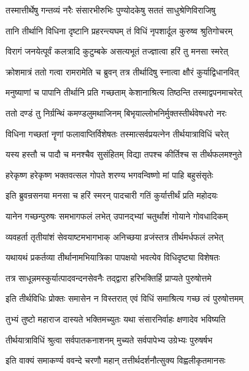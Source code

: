 \twolineshloka
{तस्मात्तीर्थेषु गन्तव्यं नरैः संसारभीरुभिः}
{पुण्योदकेषु सततं साधुश्रेणिविराजिषु}%

\twolineshloka
{तानि तीर्थानि विधिना दृष्टानि प्रहरन्त्यघम्}
{तं विधिं नृपशार्दूल कुरुष्व श्रुतिगोचरम्}%

\twolineshloka
{विरागं जनयेत्पूर्वं कलत्रादि कुटुम्बके}
{असत्यभूतं तज्ज्ञात्वा हरिं तु मनसा स्मरेत्}%

\twolineshloka
{क्रोशमात्रं ततो गत्वा रामरामेति च ब्रुवन्}
{तत्र तीर्थादिषु स्नात्वा क्षौरं कुर्याद्विधानवित्}%

\twolineshloka
{मनुष्याणां च पापानि तीर्थानि प्रति गच्छताम्}
{केशानाश्रित्य तिष्ठन्ति तस्माद्वपनमाचरेत्}%

\twolineshloka
{ततो दण्डं तु निर्ग्रन्थिं कमण्डलुमथाजिनम्}
{बिभृयाल्लोभनिर्मुक्तस्तीर्थवेषधरो नरः}%

\twolineshloka
{विधिना गच्छतां नॄणां फलावाप्तिर्विशेषतः}
{तस्मात्सर्वप्रयत्नेन तीर्थयात्राविधिं चरेत्}%

\twolineshloka
{यस्य हस्तौ च पादौ च मनश्चैव सुसंहितम्}
{विद्या तपश्च कीर्तिश्च स तीर्थफलमश्नुते}%

\twolineshloka
{हरेकृष्ण हरेकृष्ण भक्तवत्सल गोपते}
{शरण्य भगवन्विष्णो मां पाहि बहुसंसृतेः}%

\twolineshloka
{इति ब्रुवन्रसनया मनसा च हरिं स्मरन्}
{पादचारी गतिं कुर्यात्तीर्थं प्रति महोदयः}%

\twolineshloka
{यानेन गच्छन्पुरुषः समभागफलं लभेत्}
{उपानद्भ्यां चतुर्थांशं गोयाने गोवधादिकम्}%

\twolineshloka
{व्यवहर्ता तृतीयांशं सेवयाष्टमभागभाक्}
{अनिच्छया व्रजंस्तत्र तीर्थमर्धफलं लभेत्}%

\twolineshloka
{यथायथं प्रकर्तव्या तीर्थानामभियात्रिका}
{पापक्षयो भवत्येव विधिदृष्ट्या विशेषतः}%

\twolineshloka
{तत्र साधून्नमस्कुर्यात्पादवन्दनसेवनैः}
{तद्द्वारा हरिभक्तिर्हि प्राप्यते पुरुषोत्तमे}%

\twolineshloka
{इति तीर्थविधिः प्रोक्तः समासेन न विस्तरात्}
{एवं विधिं समाश्रित्य गच्छ त्वं पुरुषोत्तमम्}%

\twolineshloka
{तुभ्यं तुष्टो महाराज दास्यते भक्तिमच्युतः}
{यथा संसारनिर्वाहः क्षणादेव भविष्यति}%

\twolineshloka
{तीर्थयात्राविधिं श्रुत्वा सर्वपातकनाशनम्}
{मुच्यते सर्वपापेभ्य उग्रेभ्यः पुरुषर्षभ}%


\twolineshloka
{इति वाक्यं समाकर्ण्य ववन्दे चरणौ महान्}
{तत्तीर्थदर्शनौत्सुक्य विह्वलीकृतमानसः}%

